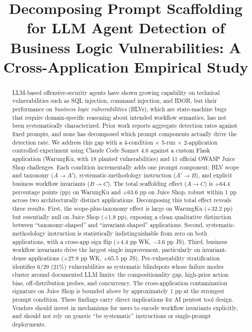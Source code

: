 \documentclass[conference]{IEEEtran}
\begin{document}
\title{Decomposing Prompt Scaffolding for LLM Agent Detection of Business Logic Vulnerabilities: A Cross-Application Empirical Study}

\author{
}

\maketitle

\begin{abstract}
LLM-based offensive-security agents have shown growing capability on technical vulnerabilities such as SQL injection, command injection, and IDOR, but their performance on \emph{business logic vulnerabilities} (BLVs), which are state-machine bugs that require domain-specific reasoning about intended workflow semantics, has not been systematically characterized. Prior work reports aggregate detection rates against fixed prompts, and none has decomposed which prompt components actually drive the detection rate. We address this gap with a 4-condition $\times$ 5-run $\times$ 2-application controlled experiment using Claude Code Sonnet 4.6 against a custom Flask application (WarungKu, with 18 planted vulnerabilities) and 11 official OWASP Juice Shop challenges. Each condition incrementally adds one prompt component: BLV scope and taxonomy ($A\!\to\!A'$), systematic-methodology instruction ($A'\!\to\!B$), and explicit business workflow invariants ($B\!\to\!C$). The total scaffolding effect ($A\!\to\!C$) is $+64.4$ percentage points (pp) on WarungKu and $+63.6$ pp on Juice Shop, robust within 1 pp across two architecturally distinct applications. Decomposing this total effect reveals three results. First, the scope-plus-taxonomy effect is large on WarungKu ($+32.2$ pp) but essentially null on Juice Shop ($+1.8$ pp), exposing a clean qualitative distinction between ``taxonomy-shaped'' and ``invariant-shaped'' applications. Second, systematic-methodology instruction is statistically indistinguishable from zero on both applications, with a cross-app sign flip ($+4.4$ pp WK, $-3.6$ pp JS). Third, business workflow invariants drive the largest single improvement, particularly on invariant-dense applications ($+27.8$ pp WK, $+65.5$ pp JS). Per-vulnerability stratification identifies $6/29$ ($21\%$) vulnerabilities as systematic blindspots whose failure modes cluster around documented LLM limits: the compositionality gap, high-prior action bias, off-distribution probes, and concurrency. The cross-application contamination signature on Juice Shop is bounded above by approximately 1 pp at the strongest prompt condition. These findings carry direct implications for AI pentest tool design. Vendors should invest in mechanisms for users to encode workflow invariants explicitly, and should not rely on generic ``be systematic'' instructions or single-prompt deployments.
\end{abstract}
\end{document}
